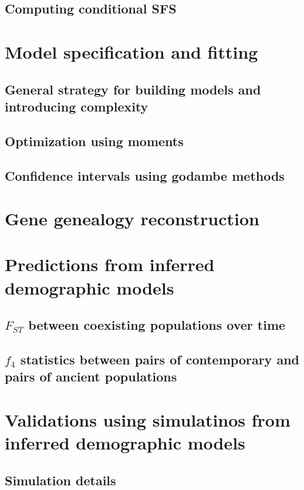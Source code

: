 \documentclass[]{article}
\begin{document}
\subsection{Computing conditional SFS}

\section{Model specification and fitting}

\subsection{General strategy for building models and introducing complexity}

\subsection{Optimization using moments}

\subsection{Confidence intervals using godambe methods}

\section{Gene genealogy reconstruction}

\section{Predictions from inferred demographic models}

\subsection{$F_{ST}$ between coexisting populations over time}

\subsection{$f_4$ statistics between pairs of contemporary and pairs of ancient populations}

\section{Validations using simulatinos from inferred demographic models}

\subsection{Simulation details}
\end{document}
